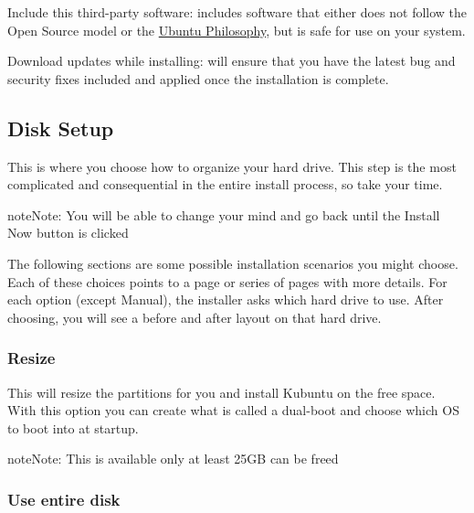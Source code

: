 \documentclass[letterpaper,10pt,english]{sphinxmanual}
\begin{document}

Include this third-party software: includes software that either does not follow the Open Source model or the \href{http://www.ubuntu.com/about/about-ubuntu/our-philosophy}{Ubuntu Philosophy}, but is safe for use on your system.

Download updates while installing: will ensure that you have the latest bug and security fixes included and applied once the installation is complete.


\subsection{Disk Setup}
\label{docs/installation:disk-setup}
This is where you choose how to organize your hard drive. This step is the most complicated and consequential in the entire install process, so take your time.

\begin{notice}{note}{Note:}
You will be able to change your mind and go back until the Install Now button is clicked
\end{notice}

The following sections are some possible installation scenarios you might choose. Each of these choices points to a page or series of pages with more details. For each option (except Manual), the installer asks which hard drive to use. After choosing, you will see a before and after layout on that hard drive.


\subsubsection{Resize}
\label{docs/installation:resize}
This will resize the partitions for you and install Kubuntu on the free space. With this option you can create what is called a dual-boot and choose which OS to boot into at startup.

\begin{notice}{note}{Note:}
This is available only at least 25GB can be freed
\end{notice}


\subsubsection{Use entire disk}
\label{docs/installation:use-entire-disk}
\end{document}

